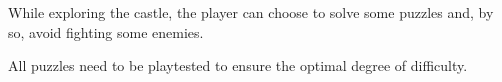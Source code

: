 While exploring the castle, the player can choose to solve some puzzles and, by so, avoid fighting some enemies.

All puzzles need to be playtested to ensure the optimal degree of difficulty.
